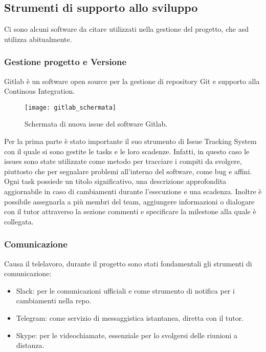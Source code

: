 \subsection{Strumenti di supporto allo sviluppo}
Ci sono alcuni software da citare utilizzati nella gestione del progetto, che \acrlong{asd} utilizza abitualmente.

\subsubsection{Gestione progetto e Versione}
Gitlab è un software open source per la gestione di repository \gls{Git} e supporto alla Continous Integration.

\begin{figure}[htbp]
	\begin{center}
		\texttt{[image: gitlab\_schermata]}
	\end{center}
	\caption {Schermata di nuova issue del software Gitlab.}
\end{figure}

\noindent Per la prima parte è stato importante il suo strumento di \gls{Issue Tracking System} con il quale si sono gestite le tasks e le
loro scadenze. Infatti, in questo caso le issues sono state utilizzate come metodo per tracciare i compiti da svolgere, piuttosto che per
segnalare problemi all'interno del software, come bug e affini. \\
\noindent Ogni task possiede un titolo significativo, una descrizione approfondita aggiornabile in caso di cambiamenti durante l'esecuzione
e una scadenza. Inoltre è possibile assegnarla a più membri del team, aggiungere informazioni o dialogare con il tutor attraverso la sezione
commenti e specificare la milestone alla quale è collegata.

\subsubsection{Comunicazione}
Causa il telelavoro, durante il progetto sono stati fondamentali gli strumenti di comunicazione:
\begin{itemize}
	\item Slack: per le comunicazioni ufficiali e come strumento di notifica per i cambiamenti nella repo.
	\item Telegram: come servizio di messaggistica istantanea, diretta con il tutor.
	\item Skype: per le videochiamate, essenziale per lo svolgersi delle riunioni a distanza.
\end{itemize}

